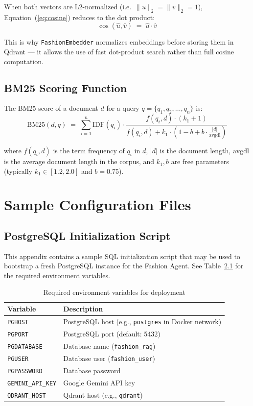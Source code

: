 \documentclass[12pt, twoside]{report}
\begin{document}
When both vectors are L2-normalized (i.e.\ $\|u\|_2 = \|v\|_2 = 1$), Equation~(\ref{eq:cosine}) reduces to the dot product:
\begin{equation}
\label{eq:dotprod}
\cos(\hat{u}, \hat{v}) \;=\; \hat{u} \cdot \hat{v}
\end{equation}

This is why \texttt{FashionEmbedder} normalizes embeddings before storing them in Qdrant --- it allows the use of fast dot-product search rather than full cosine computation.

\section{BM25 Scoring Function}

The BM25 score of a document $d$ for a query $q = \{q_1, q_2, \ldots, q_n\}$ is:
\begin{equation}
\label{eq:bm25}
\text{BM25}(d, q) \;=\; \sum_{i=1}^{n} \text{IDF}(q_i) \cdot \frac{f(q_i, d) \cdot (k_1 + 1)}{f(q_i, d) + k_1 \cdot \left(1 - b + b \cdot \frac{|d|}{\text{avgdl}}\right)}
\end{equation}

where $f(q_i, d)$ is the term frequency of $q_i$ in $d$, $|d|$ is the document length, $\text{avgdl}$ is the average document length in the corpus, and $k_1, b$ are free parameters (typically $k_1 \in [1.2, 2.0]$ and $b = 0.75$).

\chapter{Sample Configuration Files}

\section{PostgreSQL Initialization Script}

This appendix contains a sample SQL initialization script that may be used to bootstrap a fresh PostgreSQL instance for the Fashion Agent. See Table~\ref{tab:envvars} for the required environment variables.

\begin{table}[H]
\centering
\begin{tabular}{ll}
\toprule
\textbf{Variable} & \textbf{Description}\\
\midrule
\texttt{PGHOST}            & PostgreSQL host (e.g., \texttt{postgres} in Docker network)\\
\texttt{PGPORT}            & PostgreSQL port (default: 5432)\\
\texttt{PGDATABASE}        & Database name (\texttt{fashion\_rag})\\
\texttt{PGUSER}            & Database user (\texttt{fashion\_user})\\
\texttt{PGPASSWORD}        & Database password\\
\texttt{GEMINI\_API\_KEY}  & Google Gemini API key\\
\texttt{QDRANT\_HOST}      & Qdrant host (e.g., \texttt{qdrant})\\
\bottomrule
\end{tabular}
\caption{Required environment variables for deployment}
\label{tab:envvars}
\end{table}
\end{document}
